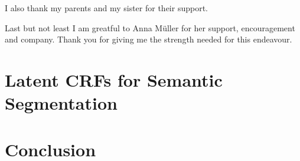 \documentclass[12pt,toc=bibnumbered, a4paper,twoside,DIV=calc]{scrbook}
\begin{document}
I also thank my parents and my sister for their support.

Last but not least I am greatful to Anna M\"uller for her support,
encouragement and company. Thank you for giving me the strength needed for this
endeavour.




%











\chapter{Latent CRFs for Semantic Segmentation}\label{ch:latent}

\chapter{Conclusion}



\end{document}
